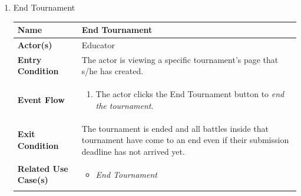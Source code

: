 \begin{enumerate}
\item End Tournament
\begin{center}
    \begin{tabular}{ | m{10em} | m{10cm}| } 
      \hline
      \textbf{Name} & End Tournament \\ 
      \hline
      \textbf{Actor(s)} & Educator \\ 
      \hline
      \textbf{Entry Condition} & The actor is viewing a specific tournament's page that s/he has created. \\ 
      \hline
      \textbf{Event Flow} & 
          \begin{enumerate}[(1)]
              \item The actor clicks the End Tournament button to \textit{end the tournament}.
          \end{enumerate}
      \\ 
      \hline
      \textbf{Exit Condition} & The tournament is ended and all battles inside that tournament have come to an end even if their submission deadline has not arrived yet.  \\ 
      \hline
      \textbf{Related Use Case(s)} & 
      \begin{itemize}
          \item \textit{End Tournament}
      \end{itemize}
          \\ 
      \hline
    \end{tabular}
\end{center}



\newpage


\end{enumerate}
